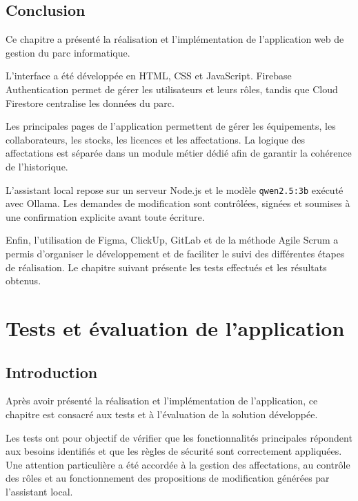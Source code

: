 \documentclass{rapportENSIAS}
\begin{document}
\section{Conclusion}

Ce chapitre a présenté la réalisation et l’implémentation de l’application web de gestion du parc informatique.

L’interface a été développée en HTML, CSS et JavaScript. Firebase Authentication permet de gérer les utilisateurs et leurs rôles, tandis que Cloud Firestore centralise les données du parc.

Les principales pages de l’application permettent de gérer les équipements, les collaborateurs, les stocks, les licences et les affectations. La logique des affectations est séparée dans un module métier dédié afin de garantir la cohérence de l’historique.

L’assistant local repose sur un serveur Node.js et le modèle \texttt{qwen2.5:3b} exécuté avec Ollama. Les demandes de modification sont contrôlées, signées et soumises à une confirmation explicite avant toute écriture.

Enfin, l’utilisation de Figma, ClickUp, GitLab et de la méthode Agile Scrum a permis d’organiser le développement et de faciliter le suivi des différentes étapes de réalisation. Le chapitre suivant présente les tests effectués et les résultats obtenus.


\chapter{Tests et évaluation de l’application}

\section{Introduction}

Après avoir présenté la réalisation et l’implémentation de l’application, ce chapitre est consacré aux tests et à l’évaluation de la solution développée.

Les tests ont pour objectif de vérifier que les fonctionnalités principales répondent aux besoins identifiés et que les règles de sécurité sont correctement appliquées. Une attention particulière a été accordée à la gestion des affectations, au contrôle des rôles et au fonctionnement des propositions de modification générées par l’assistant local.
\end{document}
